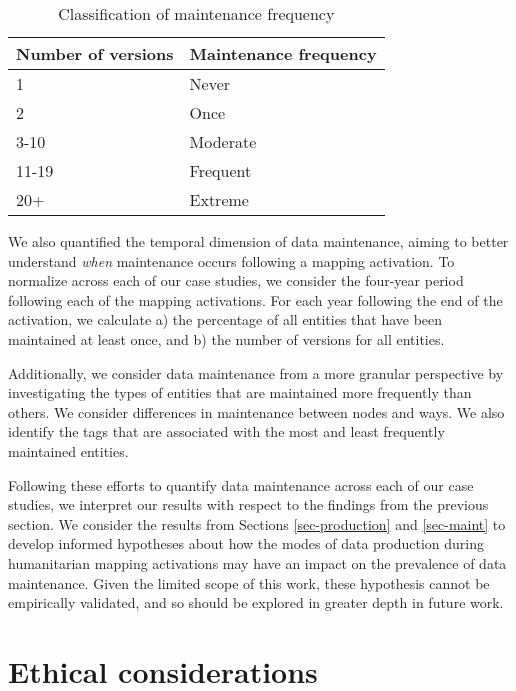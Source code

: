 \begin{table}[]
\centering
\caption{Classification of maintenance frequency}
\label{tab:freq}
\begin{tabular}{ll}
\toprule
Number of versions & Maintenance frequency \\
\midrule
1                  & Never                  \\
2                  & Once                  \\
3-10               & Moderate              \\
11-19              & Frequent              \\
20+                & Extreme               \\
\bottomrule
\end{tabular}
\end{table}

We also quantified the temporal dimension of data maintenance, aiming to better understand \textit{when} maintenance occurs following a mapping activation. To normalize across each of our case studies, we consider the four-year period following each of the mapping activations. For each year following the end of the activation, we calculate a) the percentage of all entities that have been maintained at least once, and b) the number of versions for all entities. 

Additionally, we consider data maintenance from a more granular perspective by investigating the types of entities that are maintained more frequently than others. We consider differences in maintenance between nodes and ways. We also identify the tags that are associated with the most and least frequently maintained entities. 

Following these efforts to quantify data maintenance across each of our case studies, we interpret our results with respect to the findings from the previous section. We consider the results from Sections \ref{sec-production} and \ref{sec-maint} to develop informed hypotheses about how the modes of data production during humanitarian mapping activations may have an impact on the prevalence of data maintenance. Given the limited scope of this work, these hypothesis cannot be empirically validated, and so should be explored in greater depth in future work. 

\section{Ethical considerations}

